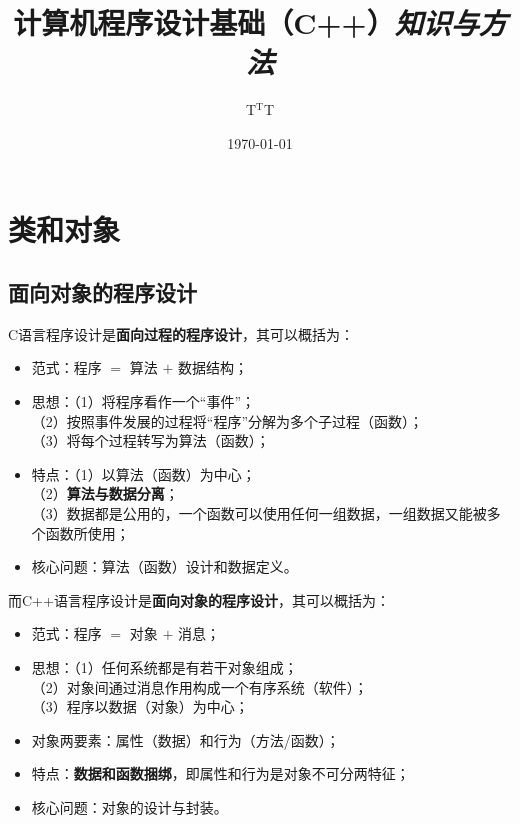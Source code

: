 \documentclass[10pt, a4paper, oneside, fontset=none]{ctexart}
\title
{
	\textbf{计算机程序设计基础（C++）}\textit{知识与方法}
}
\author{\zihao{5} T$^\text{T}$T}
\date{\zihao{5}\kai \today}
\theoremstyle{plain}
\theoremstyle{definition}
\newenvironment{twoc}{\vspace{-11pt}\begin{multicols}{2}}{\end{multicols}\vspace{-9pt}}
\newcommand{\tbome}[1]{\textbf{\run\color{meihong!75!black}#1}}
\begin{document}
\maketitle
\begin{multicols}{2}
	\begin{flushleft}
		\tableofcontents
	\end{flushleft}
\end{multicols}

\newpage
\section{类和对象}

\subsection{面向对象的程序设计}
\begin{twoc}

C语言程序设计是\textbf{面向过程的程序设计}，其可以概括为：
\begin{itemize}[leftmargin=6em, itemindent=-3em]
	\item 范式：程序 $=$ 算法 $+$ 数据结构；
	
	\item 思想：（1）将程序看作一个“事件”；\\
	（2）按照事件发展的过程将“程序”分解为多个子过程（函数）；\\
	（3）将每个过程转写为算法（函数）；

	\item 特点：（1）以算法（函数）为中心；\\
	（2）\tbome{算法与数据分离}；\\
	（3）数据都是公用的，一个函数可以使用任何一组数据，一组数据又能被多个函数所使用；

	\item 核心问题：算法（函数）设计和数据定义。
\end{itemize}

\noindent 而C++语言程序设计是\textbf{面向对象的程序设计}，其可以概括为：

\begin{itemize}[leftmargin=6em, itemindent=-3em]
	\item 范式：程序 $=$ 对象 $+$ 消息；
	
	\item 思想：（1）任何系统都是有若干对象组成；\\
	（2）对象间通过消息作用构成一个有序系统（软件）；\\
	（3）程序以数据（对象）为中心；
	
	\item 对象两要素：属性（数据）和行为（方法/函数）；
	
	\item 特点：\tbome{数据和函数捆绑}，即属性和行为是对象不可分两特征；
	
	\item 核心问题：对象的设计与封装。
\end{itemize}

\end{twoc}
\end{document}
